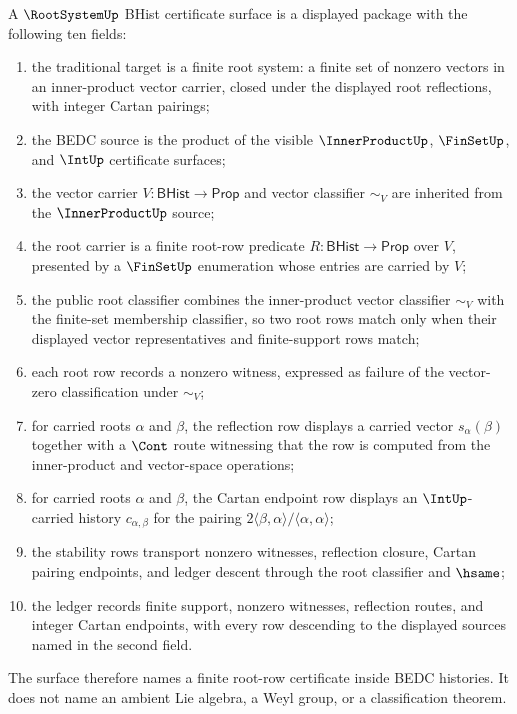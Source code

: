\begin{definition}
\label{def:rootsystem-bhist-certificate-surface}
A $\RootSystemUp$ BHist certificate surface is a displayed package with the
following ten fields:
\begin{enumerate}
  \item the traditional target is a finite root system: a finite set of
  nonzero vectors in an inner-product vector carrier, closed under the
  displayed root reflections, with integer Cartan pairings;
  \item the BEDC source is the product of the visible
  $\InnerProductUp$, $\FinSetUp$, and $\IntUp$ certificate surfaces;
  \item the vector carrier $V:\mathsf{BHist}\to\mathsf{Prop}$ and vector
  classifier $\sim_V$ are inherited from the $\InnerProductUp$ source;
  \item the root carrier is a finite root-row predicate
  $R:\mathsf{BHist}\to\mathsf{Prop}$ over $V$, presented by a
  $\FinSetUp$ enumeration whose entries are carried by $V$;
  \item the public root classifier combines the inner-product vector
  classifier $\sim_V$ with the finite-set membership classifier, so two
  root rows match only when their displayed vector representatives and
  finite-support rows match;
  \item each root row records a nonzero witness, expressed as failure of the
  vector-zero classification under $\sim_V$;
  \item for carried roots $\alpha$ and $\beta$, the reflection row displays a
  carried vector $s_\alpha(\beta)$ together with a $\Cont$ route witnessing
  that the row is computed from the inner-product and vector-space
  operations;
  \item for carried roots $\alpha$ and $\beta$, the Cartan endpoint row
  displays an $\IntUp$-carried history
  $c_{\alpha,\beta}$ for the pairing
  $2\langle\beta,\alpha\rangle/\langle\alpha,\alpha\rangle$;
  \item the stability rows transport nonzero witnesses, reflection closure,
  Cartan pairing endpoints, and ledger descent through the root classifier
  and $\hsame$;
  \item the ledger records finite support, nonzero witnesses, reflection
  routes, and integer Cartan endpoints, with every row descending to the
  displayed sources named in the second field.
\end{enumerate}
The surface therefore names a finite root-row certificate inside BEDC
histories. It does not name an ambient Lie algebra, a Weyl group, or a
classification theorem.
\end{definition}


